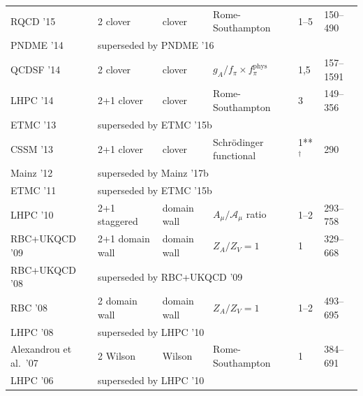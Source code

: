 \begin{table}
{\begin{tabular}{llllll}
  RQCD '15 \cite{Bali:2014nma} &
  2 clover & clover & Rome-Southampton & 1--5 & 150--490\\

  PNDME '14 \cite{Bhattacharya:2013ehc} &
  \multicolumn{5}{l}{superseded by PNDME '16} \\

  QCDSF '14 \cite{Horsley:2013ayv} &
  2 clover & clover & $g_A/f_\pi \times f_\pi^\text{phys}$ & 1,5 & 157--1591 \\

  LHPC '14 \cite{Green:2012ud} &
  2+1 clover & clover & Rome-Southampton & 3 & 149--356\\

  ETMC '13 \cite{Alexandrou:2013joa} &
  \multicolumn{5}{l}{superseded by ETMC '15b} \\

  CSSM '13 \cite{Owen:2012ts} &
  2+1 clover & clover & Schrödinger functional & 1**$^\dagger$ & 290 \\

  Mainz '12 \cite{Capitani:2012gj} &
  \multicolumn{5}{l}{superseded by Mainz '17b} \\

  ETMC '11 \cite{Alexandrou:2011nr} &
  \multicolumn{5}{l}{superseded by ETMC '15b} \\

  LHPC '10 \cite{Bratt:2010jn} &
  2+1 staggered & domain wall & $A_\mu/\mathcal{A}_\mu$ ratio & 1--2 & 293--758 \\

  RBC+UKQCD '09 \cite{Yamazaki:2009zq} &
  2+1 domain wall & domain wall & $Z_A/Z_V=1$ & 1 & 329--668 \\

  RBC+UKQCD '08 \cite{Yamazaki:2008py} &
  \multicolumn{5}{l}{superseded by RBC+UKQCD '09} \\

  RBC '08 \cite{Lin:2008uz} &
  2 domain wall & domain wall & $Z_A/Z_V=1$ & 1--2 & 493--695 \\

  LHPC '08 \cite{Hagler:2007xi} &
  \multicolumn{5}{l}{superseded by LHPC '10} \\

  Alexandrou et al.\ '07 \cite{Alexandrou:2007xj} &
  2 Wilson & Wilson & Rome-Southampton & 1 & 384--691 \\

  LHPC '06 \cite{Edwards:2005ym} &
  \multicolumn{5}{l}{superseded by LHPC '10} \\


\end{tabular}}
\end{table}
